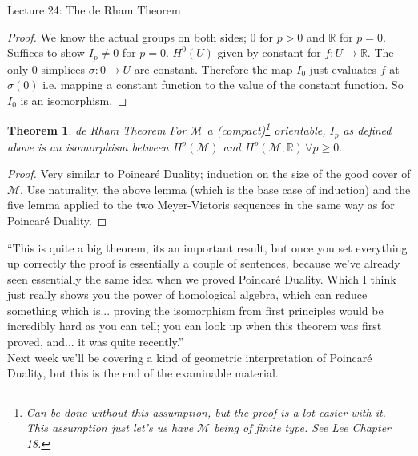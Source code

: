 \documentclass[10pt]{article}
\theoremstyle{plain}
\newtheorem{theorem}{Theorem}[section]
\theoremstyle{definition}
\newcommand{\Real}{\mathbb{R}}
\newcommand{\man}{\mathcal{M}}
\begin{document}
\begin{section}{Lecture 24: The de Rham Theorem}
\begin{proof}
    We know the actual groups on both sides; 0 for $p >0$ and $\Real$ for $p =0$. Suffices to show $I_p\neq 0$ for $p=0$. $H^0(U)$ given by constant for $f:U\to\Real$. The only 0-simplices $\sigma : {0} \to U$ are constant. Therefore the map $I_0$ just evaluates $f$ at $\sigma(0)$ i.e. mapping a constant function to the value of the constant function. So $I_0$ is an isomorphism.
\end{proof}

\begin{theorem}{de Rham Theorem}
    For $\man$ a (compact)\footnote{Can be done without this assumption, but the proof is a lot easier with it. This assumption just let's us have $\man$ being of finite type. See Lee Chapter 18.} orientable, $I_p$ as defined above is an isomorphism between $H^p(\man)$ and $H^p(\man,\Real) \,\forall p\geq 0.$
\end{theorem}

\begin{proof}
    Very similar to Poincar\'e Duality; induction on the size of the good cover of $\man$. Use naturality, the above lemma (which is the base case of induction) and the five lemma applied to the two Meyer-Vietoris sequences in the same way as for Poincar\'e Duality.
\end{proof}
``This is quite a big theorem, its an important result, but once you set everything up correctly the proof is essentially a couple of sentences, because we've already seen essentially the same idea when we proved Poincar\'e Duality. Which I think just really shows you the power of homological algebra, which can reduce something which is... proving the isomorphism from first principles would be incredibly hard as you can tell; you can look up when this theorem was first proved, and... it was quite recently.''\\
Next week we'll be covering a kind of geometric interpretation of Poincar\'e Duality, but this is the end of the examinable material.

\end{section}
\end{document}
